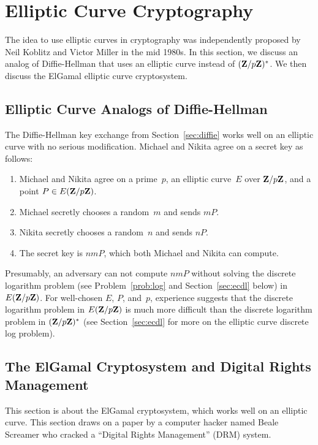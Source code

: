 \section{Elliptic Curve Cryptography}
\label{sec:ec_crypto}

The idea to use elliptic curves in cryptography was independently
proposed by Neil Koblitz and Victor Miller in the mid 1980s.  In this
section, we discuss an analog of Diffie-Hellman that uses an
elliptic curve instead of $(\mathbf{Z}/p\mathbf{Z}{})^*$.  We then discuss the ElGamal
elliptic curve cryptosystem.

\subsection{Elliptic Curve Analogs of Diffie-Hellman}
\label{sec:ec_crypto_analogues}
The Diffie-Hellman
key exchange from Section~\ref{sec:diffie}
works well on an elliptic curve
with no serious modification.
Michael and Nikita
agree on a secret key as follows:
\begin{enumerate}
\item Michael and Nikita agree on a prime~$p$, an
elliptic curve~$E$ over $\mathbf{Z}/p\mathbf{Z}{}$, and a point $P\in E(\mathbf{Z}/p\mathbf{Z}{})$.
\item Michael secretly chooses a random~$m$ and sends $mP$.
\item Nikita secretly chooses a random~$n$ and sends $nP$.
\item The secret key is $nmP$, which both Michael and
Nikita can compute.
\end{enumerate}
Presumably, an adversary can not compute $nmP$ without solving the
discrete logarithm problem  (see
Problem~\ref{prob:log} and Section~\ref{sec:ecdl} below) in
$E(\mathbf{Z}/p\mathbf{Z}{})$.  For well-chosen $E$, $P$, and~$p$, experience suggests
that the discrete logarithm problem in $E(\mathbf{Z}/p\mathbf{Z}{})$ is much more
difficult than the discrete logarithm problem in $(\mathbf{Z}/p\mathbf{Z}{})^*$ (see
Section~\ref{sec:ecdl} for more on the elliptic curve discrete log
problem).


\subsection{The ElGamal Cryptosystem and
  Digital Rights Management}\label{sec:elgamal}
This section is about
the ElGamal cryptosystem,  which works well on an elliptic curve.  This section
draws on a paper by a computer hacker named Beale Screamer who
cracked a ``Digital Rights Management'' (DRM) system.

